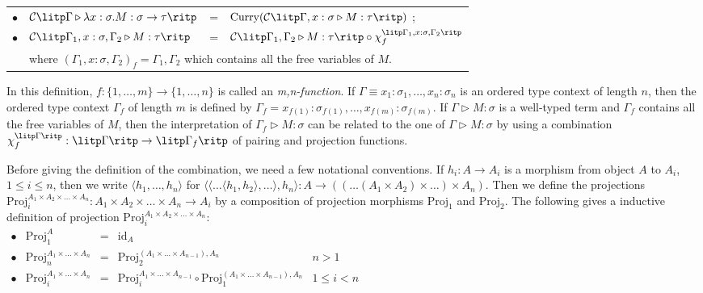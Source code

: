 \begin{definition}
\begin{myitemize}
\begin{tabular}{rlcl}
  $ \bullet $ & $ \mathcal{C} \litp \Gamma \triangleright \lambda x: \sigma .M: \sigma \to \tau \ritp $ & = & $ \text{Curry}( \mathcal{C} \litp \Gamma , x: \sigma \triangleright M: \tau \ritp ) $ ; \\[5pt]
  $ \bullet $ & $ \mathcal{C} \litp \Gamma _1 , x: \sigma , \Gamma _2 \triangleright M: \tau \ritp $ & = & $ \mathcal{C} \litp \Gamma _1 , \Gamma _2 \triangleright M: \tau \ritp \circ \chi_f^{\litp \Gamma _1 , x: \sigma , \Gamma _2 \ritp} $ \\[5pt]
  & \multicolumn{3}{l}{where $ ( \Gamma _1 , x: \sigma , \Gamma _2 )_f = \Gamma _1 , \Gamma _2 $ which contains all the free variables of $ M $.} \\[5pt]
  \end{tabular}
\end{myitemize}
\end{definition}

In this definition, $ f: \{ 1, \ldots , m \} \to \{ 1, \ldots , n \} $ is called an \emph{m,n-function}. If $ \Gamma \equiv x_1:\sigma_1, \ldots , x_n:\sigma_n $ is an ordered type context of length $ n $, then the ordered type context $ \Gamma_f $ of length $ m $ is defined by $ \Gamma_f = x_{f(1)}:\sigma_{f(1)}, \ldots , x_{f(m)}:\sigma_{f(m)} $. If $ \Gamma \triangleright M: \sigma $ is a well-typed term and $ \Gamma_f $ contains all the free variables of $ M $, then the interpretation of $ \Gamma_f \triangleright M: \sigma $ can be related to the one of $ \Gamma \triangleright M: \sigma $ by using a combination $ \chi_f^{\litp \Gamma \ritp} : \litp \Gamma \ritp \to \litp \Gamma_f \ritp $ of pairing and projection functions.

Before giving the definition of the combination, we need a few notational conventions. If $ h_i:A \to A_i $ is a morphism from object $ A $ to $ A_i $, $ 1 \leq i \leq n $, then we write $ \langle h_1, \ldots , h_n \rangle $ for $ \langle \langle \ldots \langle h_1,h_2 \rangle, \ldots \rangle , h_n \rangle : A \to (( \ldots (A_1 \times A_2) \times \ldots ) \times A_n ) $. Then we define the projections $ \text{Proj}_i^{A_1 \times A_2 \times \ldots \times A_n} : A_1 \times A_2 \times \ldots \times A_n \to A_i $ by a composition of projection morphisms $ \text{Proj}_1 $ and $ \text{Proj}_2 $. The following gives a inductive definition of projection $ \text{Proj}_i^{A_1 \times A_2 \times \ldots \times A_n} $:\\[5pt]
$
\begin{array}{rlcll}
\bullet & \text{Proj}_1^{A} & = & \text{id}_A & \\[5pt]
\bullet & \text{Proj}_n^{A_1 \times \ldots \times A_n} & = & \text{Proj}_2^{(A_1 \times \ldots \times A_{n-1}), A_n} & n > 1 \\[5pt]
\bullet & \text{Proj}_i^{A_1 \times \ldots \times A_n} & = & \text{Proj}_i^{A_1 \times \ldots \times A_{n-1}} \circ \text{Proj}_1^{(A_1 \times \ldots \times A_{n-1}), A_n} & 1 \leq i < n \\[10pt]
\end{array}
$

